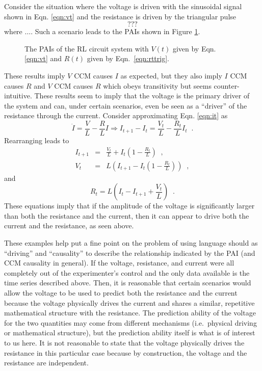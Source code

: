 \documentclass[a4paper,11pt]{article}
\begin{document}
Consider the situation where the voltage is driven with the sinusoidal signal shown in Eqn. \ref{eqn:vt} and the resistance is driven by the triangular pulse 
\begin{equation}
\label{eqn:rttrig}
???
\end{equation}
where $\ldots$.  Such a scenario leads to the PAIs shown in Figure \ref{fig:}.
\begin{figure}[ht]
\label{fig:}
\caption{The PAIs of the RL circuit system with $V(t)$ given by Eqn. \ref{eqn:vt} and $R(t)$ given by Eqn.\ \ref{eqn:rttrig}.}
\end{figure}
These results imply $V$ CCM causes $I$ as expected, but they also imply $I$ CCM causes $R$ and $V$ CCM causes $R$ which obeys transitivity but seems counter-intuitive.  These results seem to imply that the voltage is the primary driver of the system and can, under certain scenarios, even be seen as a ``driver'' of the resistance through the current.  Consider approximating Eqn. \ref{eqn:it} as
\begin{equation}
\dot{I} = \frac{V}{L} - \frac{R}{L} I\Rightarrow I_{t+1}-I_t = \frac{V_t}{L} - \frac{R_t}{L} I_t\;\;.
\end{equation}
Rearranging leads to
\begin{eqnarray}
I_{t+1} &=& \frac{V_t}{L}+I_t\left(1-\frac{R_t}{L}\right)\;\;,\\
V_t &=& L\left(I_{t+1}-I_t\left(1-\frac{R_t}{L}\right)\right)\;\;,
\end{eqnarray}
and
\begin{equation}
R_t = L\left(I_t-I_{t+1}+\frac{V_t}{L}\right)\;\;.
\end{equation}
These equations imply that if the amplitude of the voltage is significantly larger than both the resistance and the current, then it can appear to drive both the current and the resistance, as seen above.

These examples help put a fine point on the problem of using language should as ``driving'' and ``causality'' to describe the relationship indicated by the PAI (and CCM causality in general).  If the voltage, resistance, and current were all completely out of the experimenter's control and the only data available is the time series described above.  Then, it is reasonable that certain scenarios would allow the voltage to be used to predict both the resistance and the current because the voltage physically drives the current and shares a similar, repetitive mathematical structure with the resistance.  The prediction ability of the voltage for the two quantities may come from different mechanisms (i.e.\ physical driving or mathematical structure), but the prediction ability itself is what is of interest to us here.  It is not reasonable to state that the voltage physically drives the resistance in this particular case because by construction, the voltage and the resistance are independent.  
\end{document}

